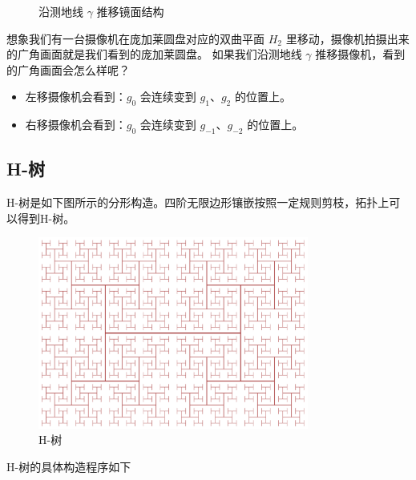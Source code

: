 \documentclass[a4paper,12pt]{article}
\begin{document}
\begin{figure}[ht]
\caption{沿测地线 $\gamma$ 推移镜面结构}
\end{figure}

想象我们有一台摄像机在庞加莱圆盘对应的双曲平面 $H_2$ 里移动，摄像机拍摄出来的广角画面就是我们看到的庞加莱圆盘。
如果我们沿测地线 $\gamma$ 推移摄像机，看到的广角画面会怎么样呢？
\begin{itemize}
    \item 左移摄像机会看到：$g_0$ 会连续变到 $g_1$、$g_2$ 的位置上。
    \item 右移摄像机会看到：$g_0$ 会连续变到 $g_{-1}$、$g_{-2}$ 的位置上。
\end{itemize}

\newpage

\subsection{H-树}

H-树是如下图所示的分形构造。四阶无限边形镶嵌按照一定规则剪枝，拓扑上可以得到H-树。

\begin{figure}[ht]
\centering
\includegraphics[width=3.5in]{images/2000px-H_tree.png}
\caption{H-树}
\end{figure}

H-树的具体构造程序如下
\end{document}
